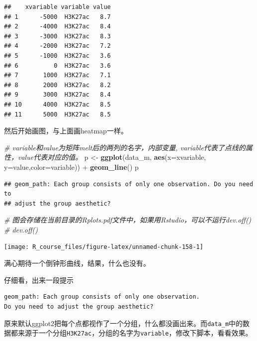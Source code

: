 \documentclass[]{article}
\newenvironment{Shaded}{\begin{snugshade}}{\end{snugshade}}
\newcommand{\KeywordTok}[1]{\textcolor[rgb]{0.13,0.29,0.53}{\textbf{{#1}}}}
\newcommand{\DataTypeTok}[1]{\textcolor[rgb]{0.13,0.29,0.53}{{#1}}}
\newcommand{\StringTok}[1]{\textcolor[rgb]{0.31,0.60,0.02}{{#1}}}
\newcommand{\CommentTok}[1]{\textcolor[rgb]{0.56,0.35,0.01}{\textit{{#1}}}}
\newcommand{\NormalTok}[1]{{#1}}
\numberwithin{figure}{section}
\numberwithin{table}{section}
\theoremstyle{definition}
\theoremstyle{definition}
\theoremstyle{definition}
\theoremstyle{remark}
\begin{document}
\begin{verbatim}
##    xvariable variable value
## 1      -5000  H3K27ac   8.7
## 2      -4000  H3K27ac   8.4
## 3      -3000  H3K27ac   8.3
## 4      -2000  H3K27ac   7.2
## 5      -1000  H3K27ac   3.6
## 6          0  H3K27ac   3.6
## 7       1000  H3K27ac   7.1
## 8       2000  H3K27ac   8.2
## 9       3000  H3K27ac   8.4
## 10      4000  H3K27ac   8.5
## 11      5000  H3K27ac   8.5
\end{verbatim}

然后开始画图，与上面画heatmap一样。

\begin{Shaded}
\begin{Highlighting}[]
\CommentTok{# variable和value为矩阵melt后的两列的名字，内部变量, variable代表了点线的属性，value代表对应的值。}
\NormalTok{p <-}\StringTok{ }\KeywordTok{ggplot}\NormalTok{(data_m, }\KeywordTok{aes}\NormalTok{(}\DataTypeTok{x=}\NormalTok{xvariable, }\DataTypeTok{y=}\NormalTok{value,}\DataTypeTok{color=}\NormalTok{variable)) +}\StringTok{ }\KeywordTok{geom_line}\NormalTok{()}
\NormalTok{p}
\end{Highlighting}
\end{Shaded}

\begin{verbatim}
## geom_path: Each group consists of only one observation. Do you need to
## adjust the group aesthetic?
\end{verbatim}

\begin{Shaded}
\begin{Highlighting}[]
\CommentTok{# 图会存储在当前目录的Rplots.pdf文件中，如果用Rstudio，可以不运行dev.off()}
\CommentTok{# dev.off()}
\end{Highlighting}
\end{Shaded}

\begin{center}\texttt{[image: R\_course\_files/figure-latex/unnamed-chunk-158-1]} \end{center}

满心期待一个倒钟形曲线，结果，什么也没有。

仔细看，出来一段提示

\begin{verbatim}
geom_path: Each group consists of only one observation. 
Do you need to adjust the group aesthetic?
\end{verbatim}

原来默认ggplot2把每个点都视作了一个分组，什么都没画出来。而\texttt{data\_m}中的数据都来源于一个分组\texttt{H3K27ac}，分组的名字为\texttt{variable}，修改下脚本，看看效果。
\end{document}
